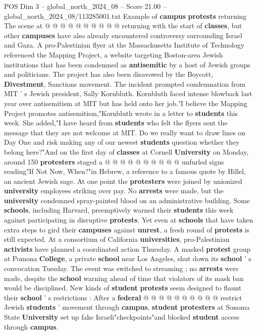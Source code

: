 \begin{textsample}{POS Dim 3 – global\_north\_2024\_08 – Score 21.00 – global\_north\_2024\_08/113285001.txt}
Example of \textbf{campus} \textbf{protests} returning The scene at @ @ @ @ @ @ @ @ @ @ returning with the start of \textbf{classes}, but other \textbf{campuses} have also already encountered controversy surrounding Israel and Gaza.
A pro-Palestinian flyer at the Massachusetts Institute of Technology referenced the Mapping Project, a website targeting Boston-area Jewish institutions that has been condemned as \textbf{antisemitic} by a host of Jewish groups and politicians.
The project has also been disavowed by the Boycott, \textbf{Divestment}, Sanctions movement.
The incident prompted condemnation from MIT ' s Jewish president, Sally Kornbluth.
Kornbluth faced intense blowback last year over antisemitism at MIT but has held onto her job."I believe the Mapping Project promotes antisemitism,"Kornbluth wrote in a letter to \textbf{students} this week.
She added,"I have heard from \textbf{students} who felt the flyers sent the message that they are not welcome at MIT.
Do we really want to draw lines on Day One and risk making any of our newest \textbf{students} question whether they belong here?"And on the first day of \textbf{classes} at Cornell \textbf{University} on Monday, around 150 \textbf{protesters} staged a @ @ @ @ @ @ @ @ @ @ unfurled signs reading"If Not Now, When?"in Hebrew, a reference to a famous quote by Hillel, an ancient Jewish sage.
At one point the \textbf{protesters} were joined by unionized \textbf{university} employees striking over pay.
No \textbf{arrests} were made, but the \textbf{university} condemned spray-painted blood on an administrative building.
Some \textbf{schools}, including Harvard, preemptively warned their \textbf{students} this week against participating in disruptive \textbf{protests}.
Yet even at \textbf{schools} that have taken extra steps to gird their \textbf{campuses} against \textbf{unrest}, a fresh round of \textbf{protests} is still expected.
At a consortium of California \textbf{universities}, pro-Palestinian \textbf{activists} have planned a coordinated action Thursday.
A masked \textbf{protest} group at Pomona \textbf{College}, a private \textbf{school} near Los Angeles, shut down its \textbf{school} ' s convocation Tuesday.
The event was switched to streaming ; no \textbf{arrests} were made, despite the \textbf{school} warning ahead of time that violators of its mask ban would be disciplined.
New kinds of \textbf{student} \textbf{protests} seem designed to flaunt their \textbf{school} ' s restrictions : After a \textbf{federal} @ @ @ @ @ @ @ @ @ @ restrict Jewish \textbf{students} ' movement through \textbf{campus}, \textbf{student} \textbf{protesters} at Sonoma State \textbf{University} set up fake Israeli"checkpoints"and blocked \textbf{student} access through \textbf{campus}.

\end{textsample}
